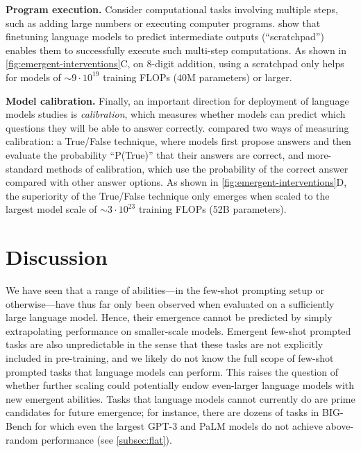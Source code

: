 \documentclass[10pt]{article} %
\begin{document}
\vspace{3mm}
\noindent
\textbf{Program execution.}
Consider computational tasks involving multiple steps, such as adding large numbers or executing computer programs.
\citet{nye2021show} show that finetuning language models to predict intermediate outputs (``scratchpad'') enables them to successfully execute such multi-step computations.
As shown in \cref{fig:emergent-interventions}C, on 8-digit addition, using a scratchpad only helps for models of ${\sim}9 \cdot 10^{19}$ training FLOPs (40M parameters) or larger. 


\vspace{3mm}
\noindent
\textbf{Model calibration.}
Finally, an important direction for deployment of language models studies is \textit{calibration}, which measures whether models can predict which questions they will be able to answer correctly. 
\citet{kadavath2022language} compared two ways of measuring calibration: a True/False technique, where models first propose answers and then evaluate the probability ``P(True)'' that their answers are correct, and more-standard methods of calibration, which use the probability of the correct answer compared with other answer options. 
As shown in \cref{fig:emergent-interventions}D, the superiority of the True/False technique only emerges when scaled to the largest model scale of ${\sim}3 \cdot 10^{23}$ training FLOPs (52B parameters).




\section{Discussion}\label{sec:discussion}
We have seen that a range of abilities---in the few-shot prompting setup or otherwise---have thus far only been observed when evaluated on a sufficiently large language model.
Hence, their emergence cannot be predicted by simply extrapolating performance on smaller-scale models.
Emergent few-shot prompted tasks are also unpredictable in the sense that these tasks are not explicitly included in pre-training, and we likely do not know the full scope of few-shot prompted tasks that language models can perform.
This raises the question of whether further scaling could potentially endow even-larger language models with new emergent abilities.
Tasks that language models cannot currently do are prime candidates for future emergence; for instance, there are dozens of tasks in BIG-Bench for which even the largest GPT-3 and PaLM models do not achieve above-random performance (see \cref{subsec:flat}).
\end{document}
